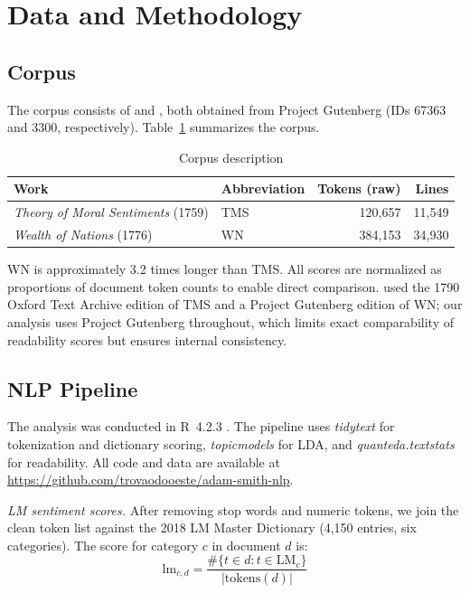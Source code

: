 \documentclass[12pt,a4paper]{article}
\begin{document}
\section{Data and Methodology}

\subsection{Corpus}

The corpus consists of \citet{SmithTMS1759} and \citet{SmithWoN1776},
both obtained from Project Gutenberg (IDs 67363 and 3300, respectively).
Table~\ref{tab:corpus} summarizes the corpus.

\begin{table}[H]
\centering
\caption{Corpus description}
\label{tab:corpus}
\small
\begin{tabular}{llrr}
\toprule
Work & Abbreviation & Tokens (raw) & Lines \\
\midrule
\textit{Theory of Moral Sentiments} (1759) & TMS & 120,657 & 11,549 \\
\textit{Wealth of Nations} (1776)          & WN  & 384,153 & 34,930 \\
\bottomrule
\end{tabular}
\end{table}

WN is approximately 3.2 times longer than TMS.
All scores are normalized as proportions of document token counts to
enable direct comparison.
\citeauthor{Ballandonne2023} used the 1790 Oxford Text Archive edition
of TMS and a Project Gutenberg edition of WN; our analysis uses Project
Gutenberg throughout, which limits exact comparability of readability
scores but ensures internal consistency.

\subsection{NLP Pipeline}

The analysis was conducted in R~4.2.3 \citep{Rcoreteam2023}.
The pipeline uses \textit{tidytext} \citep{Silge2016} for tokenization
and dictionary scoring, \textit{topicmodels} \citep{Grun2011} for LDA,
and \textit{quanteda.textstats} \citep{Benoit2018} for readability.
All code and data are available at \url{https://github.com/trovaodooeste/adam-smith-nlp}.

\textit{LM sentiment scores.} After removing stop words and numeric
tokens, we join the clean token list against the 2018 LM Master
Dictionary \citep{LoughranMcDonald2011} (4,150 entries, six categories).
The score for category $c$ in document $d$ is:
\begin{equation}
  \text{lm}_{c,d} = \frac{\#\{t \in d : t \in \text{LM}_c\}}{|\text{tokens}(d)|}
\end{equation}
\end{document}
